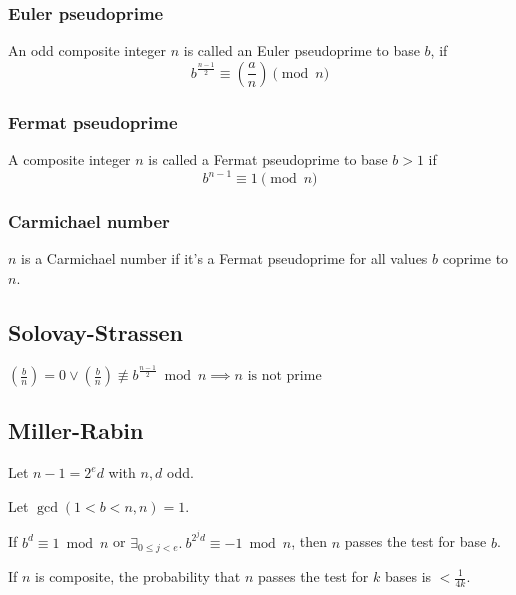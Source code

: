 \documentclass{article}
\begin{document}
\subsubsection{Euler pseudoprime}
An odd composite integer $n$ is called an Euler pseudoprime to base $b$, if
$$b^{\frac{n-1}{2}} ≡ (\frac{a}{n}) \pmod n$$

\subsubsection{Fermat pseudoprime}
A composite integer $n$ is called a Fermat pseudoprime to base $b>1$ if
$$b^{n-1} ≡ 1 \pmod n$$

\subsubsection{Carmichael number}
$n$ is a Carmichael number if it's a Fermat pseudoprime for all values $b$ coprime to $n$.

\subsection{Solovay-Strassen}
$(\frac{b}{n}) = 0 ∨ (\frac{b}{n}) \not\equiv b^{\frac{n-1}{2}} \bmod n ⟹ n\textrm{ is not prime}$

\subsection{Miller-Rabin}
Let $n - 1 = 2^ed$ with $n,d$ odd.

Let $\gcd(1<b<n,n) = 1$.

If $b^d ≡ 1 \bmod n$ or $\displaystyle∃_{0≤j<e}.\ b^{2^{j}d} ≡ -1 \bmod n$, then $n$ passes the test for base $b$.

If $n$ is composite, the probability that $n$ passes the test for $k$ bases is
$< \frac{1}{4k}$.
\EndPage
\end{document}
